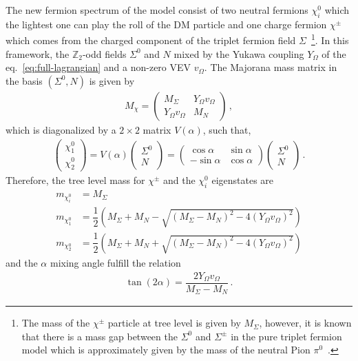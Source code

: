\documentclass[12pt,letterpaper]{article}
\begin{document}
The new fermion spectrum of the model consist of two neutral fermions $\chi_i^0$ which the lightest one can play the roll of the DM particle and one charge fermion $\chi^{\pm}$ which comes from the charged component of the triplet fermion field $\Sigma$~\footnote{The mass of the $\chi^{\pm}$ particle at tree level is given by $M_{\Sigma}$, however, it is known that there is a mass gap between the $\Sigma^0$ and $\Sigma^{\pm}$ in the pure triplet fermion model which is approximately given by the mass of the neutral Pion $\pi^0$~\cite{Cirelli:2005uq, Choubey:2017yyn}.}. In this framework, the $\mathbb{Z}_2$-odd fields $\Sigma^0$ and $N$ mixed by the Yukawa coupling $Y_{\Omega}$ of the eq.~\ref{eq:full-lagrangian} and a non-zero VEV $v_{\Omega}$. The Majorana mass matrix in the basis $(\Sigma^0, N)$ is given by
%
\begin{align}
\label{eq:M-chi-matrix}
M_{\chi}=
\begin{pmatrix}
M_{\Sigma} & Y_{\Omega}v_{\Omega} \\
Y_{\Omega}v_{\Omega} & M_N
\end{pmatrix}\,,
\end{align}
%
which is diagonalized by a $2\times2$ matrix $V(\alpha)$, such that,
%
\begin{align}
\label{eq:M-chi-rotation}
\begin{pmatrix}
\chi_1^0 \\
\chi_2^0
\end{pmatrix}=
V(\alpha)
\begin{pmatrix}
\Sigma^0 \\
N
\end{pmatrix}
=
\begin{pmatrix}
\cos\alpha & \sin\alpha \\
-\sin\alpha & \cos\alpha
\end{pmatrix}
\begin{pmatrix}
\Sigma^0 \\
N
\end{pmatrix}\,.
\end{align}
%
Therefore, the tree level mass for $\chi^{\pm}$ and the $\chi^0_i$ eigenstates are
%
\begin{align}
m_{\chi_i^0} &= M_\Sigma \nonumber \\
m_{\chi_1^0} &= \dfrac{1}{2}\left(M_\Sigma + M_N - \sqrt{(M_\Sigma - M_N)^2-4(Y_{\Omega}v_{\Omega})^2} \right)\nonumber \\
\label{eq:chi-masses}
m_{\chi_2^0} &= \dfrac{1}{2}\left(M_\Sigma + M_N + \sqrt{(M_\Sigma - M_N)^2-4(Y_{\Omega}v_{\Omega})^2} \right)
\end{align}
and the $\alpha$ mixing angle fulfill the relation
\begin{align}
\label{eq:tan-alpha}
\tan(2\alpha)= \dfrac{2Y_{\Omega}v_\Omega}{M_{\Sigma}-M_N}\,.
\end{align}
\end{document}
